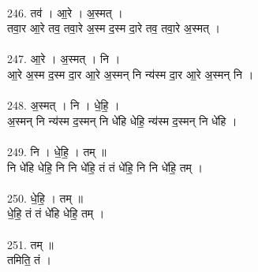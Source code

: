 \\
246. तव॑ । आ॒रे । अ॒स्मत् ।\\
तवा॒र आ॒रे तव॒ तवा॒रे अ॒स्म द॒स्म दा॒रे तव॒ तवा॒रे अ॒स्मत् ।\\
\\
247. आ॒रे । अ॒स्मत् । नि ।\\
आ॒रे अ॒स्म द॒स्म दा॒र आ॒रे अ॒स्मन् नि न्य॑स्म दा॒र आ॒रे अ॒स्मन् नि ।\\
\\
248. अ॒स्मत् । नि । धे॒हि॒ ।\\
अ॒स्मन् नि न्य॑स्म द॒स्मन् नि धे॑हि धेहि॒ न्य॑स्म द॒स्मन् नि धे॑हि ।\\
\\
249. नि । धे॒हि॒ । तम् ॥\\
नि धे॑हि धेहि॒ नि नि धे॑हि॒ तं तं धे॑हि॒ नि नि धे॑हि॒ तम् ।\\
\\
250. धे॒हि॒ । तम् ॥\\
धे॒हि॒ तं तं धे॑हि धेहि॒ तम् ।\\
\\
251. तम् ॥\\
तमिति॒ तं ।\\
\subsection{}
\subsection{}
\subsection{}
\subsection{}
\subsection{}
\subsection{}
\subsection{}
\subsection{}
\subsection{}
\subsection{}
\subsection{}
